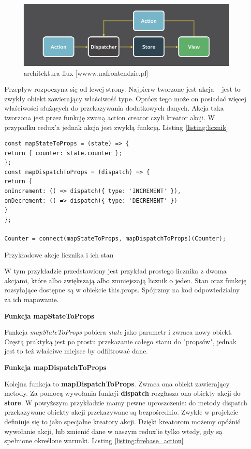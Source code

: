 \begin{figure}
	\centering\includegraphics[width=.6\textwidth]{img/flux}
	\caption{architektura flux [wwww.nafrontendzie.pl]}\label{rys:flux}%
\end{figure}

Przepływ rozpoczyna się od lewej strony. Najpierw tworzone jest akcja – jest to zwykły obiekt zawierający właściwość type. Oprócz tego może on posiadać więcej właściwości służących do przekazywania dodatkowych danych. Akcja taka tworzona jest przez funkcję zwaną action creator czyli kreator akcji. W przypadku redux'a jednak akcja jest zwykłą funkcją. Listing \ref{listing:licznik}

\begin{listing}
\begin{verbatim}
const mapStateToProps = (state) => {
return { counter: state.counter };
};
const mapDispatchToProps = (dispatch) => {
return {
onIncrement: () => dispatch({ type: 'INCREMENT' }),
onDecrement: () => dispatch({ type: 'DECREMENT' })
}
};

Counter = connect(mapStateToProps, mapDispatchToProps)(Counter);
\end{verbatim}
\caption{Przykładowe akcje licznika i ich stan} \label{listing:licznik}
\end{listing}

W tym przykładzie przedstawiony jest przykład prostego licznika z dwoma akcjami, które albo zwiększają albo zmniejszają licznik o jeden. Stan oraz funkcję rozsyłające dostępne są w obiekcie this.props. Spójrzmy na kod odpowiedzialny za ich mapowanie.
\begin{center}
	\textbf{Funkcja mapStateToProps}
\end{center}
Funkcja \textit{mapStateToProps} pobiera \textit{state} jako parametr i zwraca nowy obiekt. Częstą praktyką jest po prostu przekazanie całego stanu do "propsów", jednak jest to też właściwe miejsce by odfiltrować dane. 
\begin{center}
	\textbf{Funkcja mapDispatchToProps}
\end{center}
Kolejna funkcja to \textbf{mapDispatchToProps}. Zwraca ona obiekt zawierający metody. Za pomocą wywołania funkcji \textbf{dispatch} rozgłasza ona obiekty akcji do \textbf{store}. W powyższym przykładzie mamy pewne uproszczenie: do metody dispatch przekazywane obiekty akcji przekazywane są bezpośrednio. Zwykle w projekcie definiuje się to jako specjalne kreatory akcji. Dzięki kreatorom możemy opóźnić wywołanie akcji, lub zmienić dane w naszym redux'ie tylko wtedy, gdy są spełnione określone warunki. Listing \ref{listing:firebase_action}

